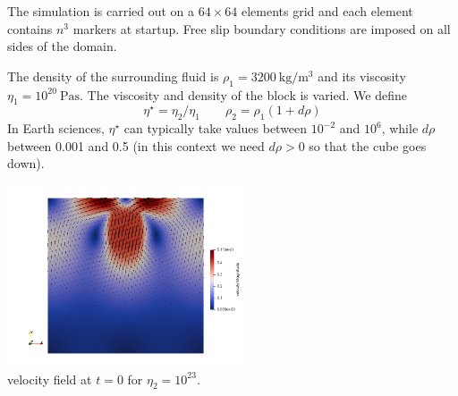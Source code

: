 The simulation is carried out on a $64\times64$ elements grid and each element contains $n^3$ markers
at startup. Free slip boundary conditions are imposed on all sides of the domain. 

The density of the surrounding fluid is $\rho_1=3200~\si{\kg\per\cubic\meter}$
and its viscosity $\eta_1=10^{20}~\si{\pascal\second}$.
The viscosity and density of the block is varied. We define
\[
\eta^\star=\eta_2/\eta_1
\quad\quad
\rho_2=\rho_1 (1 + d\rho)
\]
In Earth sciences, $\eta^\star$ can typically take values between $10^{-2}$ and $10^6$,
while $d\rho$ between 0.001 and 0.5 (in this context we need $d\rho>0$ so that the cube 
goes down).

\begin{center}
\includegraphics[width=7cm]{python_codes/fieldstone_67/sinking/vel0}\\
{\captionfont velocity field at $t=0$ for $\eta_2=10^{23}$.}
\end{center}

